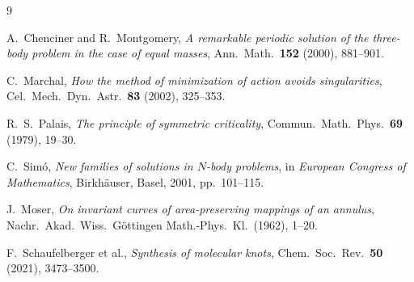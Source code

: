 \documentclass[12pt, a4paper]{article}
\theoremstyle{plain}
\theoremstyle{definition}
\begin{document}
\begin{thebibliography}{9}

A.~Chenciner and R.~Montgomery,
\textit{A remarkable periodic solution of the three-body problem in
the case of equal masses},
Ann.\ Math.\ \textbf{152} (2000), 881--901.

C.~Marchal,
\textit{How the method of minimization of action avoids singularities},
Cel.\ Mech.\ Dyn.\ Astr.\ \textbf{83} (2002), 325--353.

R.~S.~Palais,
\textit{The principle of symmetric criticality},
Commun.\ Math.\ Phys.\ \textbf{69} (1979), 19--30.

C.~Sim\'o,
\textit{New families of solutions in $N$-body problems},
in \textit{European Congress of Mathematics},
Birkh\"auser, Basel, 2001, pp.\ 101--115.

J.~Moser,
\textit{On invariant curves of area-preserving mappings of an annulus},
Nachr.\ Akad.\ Wiss.\ G\"ottingen Math.-Phys.\ Kl.\ (1962), 1--20.

F.~Schaufelberger et al.,
\textit{Synthesis of molecular knots},
Chem.\ Soc.\ Rev.\ \textbf{50} (2021), 3473--3500.

\end{thebibliography}
\end{document}
